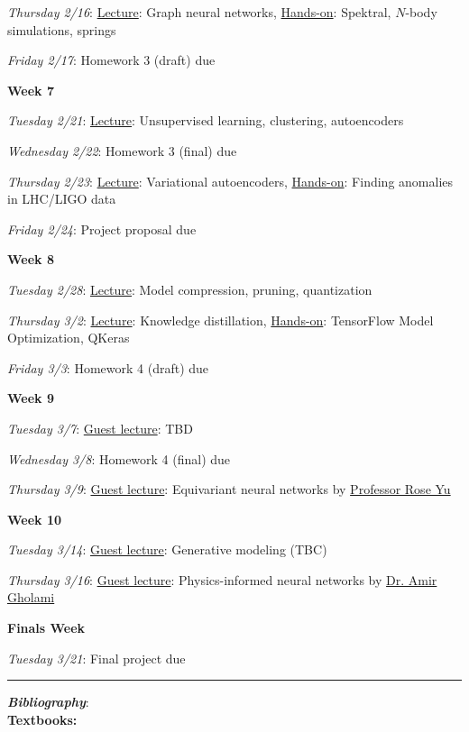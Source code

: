 \documentclass[12pt]{article}
\begin{document}
\emph{Thursday 2/16}: \underline{Lecture}: Graph neural networks, \underline{Hands-on}: Spektral, $N$-body simulations, springs

\emph{Friday 2/17}: Homework 3 (draft) due

\noindent\textbf{Week 7}

\emph{Tuesday 2/21}: \underline{Lecture}: Unsupervised learning, clustering, autoencoders

\emph{Wednesday 2/22}: Homework 3 (final) due

\emph{Thursday 2/23}: \underline{Lecture}: Variational autoencoders, \underline{Hands-on}: Finding anomalies in LHC/LIGO data

\emph{Friday 2/24}: Project proposal due

\noindent\textbf{Week 8}

\emph{Tuesday 2/28}: \underline{Lecture}: Model compression, pruning, quantization

\emph{Thursday 3/2}: \underline{Lecture}: Knowledge distillation, \underline{Hands-on}: TensorFlow Model Optimization, QKeras

\emph{Friday 3/3}: Homework 4 (draft) due

\noindent\textbf{Week 9}

\emph{Tuesday 3/7}: \underline{Guest lecture}: TBD

\emph{Wednesday 3/8}: Homework 4 (final) due

\emph{Thursday 3/9}: \underline{Guest lecture}: Equivariant neural networks by \href{https://roseyu.com/}{Professor Rose Yu}

\noindent\textbf{Week 10}

\emph{Tuesday 3/14}: \underline{Guest lecture}: Generative modeling (TBC)

\emph{Thursday 3/16}: \underline{Guest lecture}: Physics-informed neural networks by \href{https://amirgholami.org/}{Dr. Amir Gholami}

\noindent\textbf{Finals Week}

\emph{Tuesday 3/21}: Final project due

\begin{center}
	\rule{\textwidth}{0.5pt}
\end{center}

\noindent\textbf{\emph{Bibliography}}:\\

\textbf{Textbooks:}

\newrefsection
\nocite{Mehta:2019,Abu-Mostafa:2012,Erdman:2021,Zeljko:2014,Calafiura:2022,Chollet:2021}
\printbibliography[heading=none]
\end{document}
